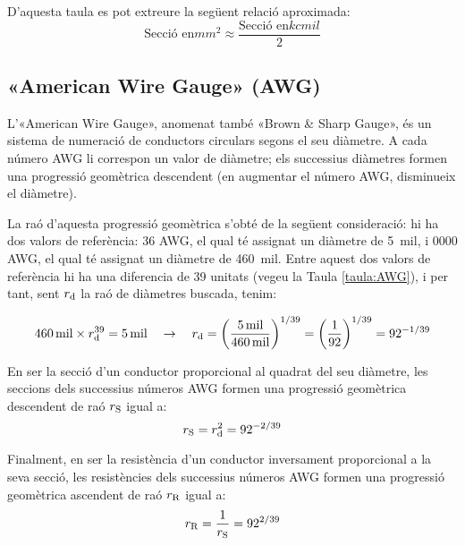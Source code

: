 D'aquesta taula es pot extreure la següent relació aproximada:
\begin{equation}
  \text{Secció en}\unit{mm^2} \approx \dfrac{\text{Secció en}\unit{kcmil}}{2}
\end{equation}



\subsection{«American Wire Gauge» (AWG)}\label{sec:awg}

L'«American Wire Gauge», anomenat també «Brown \& Sharp Gauge», és un sistema de numeració de conductors circulars segons el seu diàmetre. A cada número AWG li correspon un valor de diàmetre; els successius diàmetres formen una progressió geomètrica descendent (en augmentar el número AWG, disminueix el diàmetre).

La raó d'aquesta progressió geomètrica s'obté de la següent consideració: hi ha dos valors de referència: 36 AWG, el qual té assignat un diàmetre de \SI{5}{mil}, i 0000 AWG, el qual té assignat un diàmetre de \SI{460}{mil}. Entre aquest dos valors de referència hi ha una diferencia de 39 unitats (vegeu la Taula \vref{taula:AWG}), i per tant, sent $r_\mathrm{d}$ la raó de diàmetres buscada, tenim:

\begin{equation}
   \SI{460}{mil} \times r_\mathrm{d}^{39} = \SI{5}{mil} \quad \rightarrow \quad r_\mathrm{d} = \left( \frac{\SI{5}{mil}}{\SI{460}{mil}} \right)^{1/39} = \left( \frac{1}{92} \right)^{1/39} = 92^{-1/39}
\end{equation}

En ser la secció d'un conductor proporcional al quadrat del seu diàmetre, les seccions dels successius números AWG formen una progressió geomètrica  descendent de raó $r_\mathrm{S}$ igual a: \begin{equation}
   r_\mathrm{S} = r_\mathrm{d}^2 = 92^{-2/39}
\end{equation}

Finalment, en ser la resistència d'un conductor inversament proporcional a la seva secció, les resistències dels successius números AWG formen una progressió geomètrica ascendent de raó $r_\mathrm{R}$ igual a:
\begin{equation}
   r_\mathrm{R} = \frac{1}{r_\mathrm{S}} = 92^{2/39}
\end{equation}

